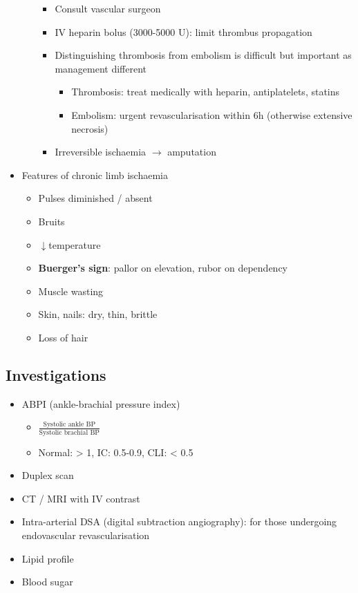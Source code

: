 \documentclass[
  12pt,
]{memoir}
\providecommand{\tightlist}{%
  \setlength{\itemsep}{0pt}\setlength{\parskip}{0pt}}
\begin{document}
\begin{itemize}
\begin{itemize}
    \begin{itemize}
    \tightlist
    \item
      Consult vascular surgeon
    \item
      IV heparin bolus (3000-5000 U): limit thrombus propagation
    \item
      Distinguishing thrombosis from embolism is difficult but important
      as management different

      \begin{itemize}
      \tightlist
      \item
        Thrombosis: treat medically with heparin, antiplatelets, statins
      \item
        Embolism: urgent revascularisation within 6h (otherwise
        extensive necrosis)
      \end{itemize}
    \item
      Irreversible ischaemia \(\rightarrow\) amputation
    \end{itemize}
  \end{itemize}
\item
  Features of chronic limb ischaemia

  \begin{itemize}
  \tightlist
  \item
    Pulses diminished / absent
  \item
    Bruits
  \item
    \(\downarrow\)temperature
  \item
    \textbf{Buerger's sign}: pallor on elevation, rubor on dependency
  \item
    Muscle wasting
  \item
    Skin, nails: dry, thin, brittle
  \item
    Loss of hair
  \end{itemize}
\end{itemize}

\hypertarget{investigations-3}{%
\subsection{Investigations}\label{investigations-3}}

\begin{itemize}
\tightlist
\item
  ABPI (ankle-brachial pressure index)

  \begin{itemize}
  \tightlist
  \item
    \(\frac{\text{Systolic ankle BP}}{\text{Systolic brachial BP}}\)
  \item
    Normal: \textgreater{} 1, IC: 0.5-0.9, CLI: \textless{} 0.5
  \end{itemize}
\item
  Duplex scan
\item
  CT / MRI with IV contrast
\item
  Intra-arterial DSA (digital subtraction angiography): for those
  undergoing endovascular revascularisation
\item
  Lipid profile
\item
  Blood sugar
\end{itemize}
\end{document}
